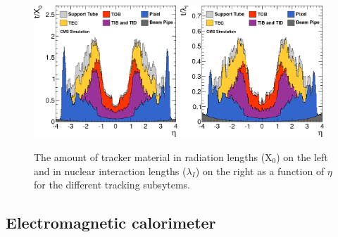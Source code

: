 \begin{figure}
  \includegraphics[width=0.48\textwidth]{ch2_cms_exp/plots/tracker_material.png}
  \includegraphics[width=0.48\textwidth]{ch2_cms_exp/plots/tracker_material_lambda.png}
  \caption[CMS tracker material budget]{The amount of \CMS tracker material in radiation lengths (X$_{0}$) on the left and in nuclear interaction lengths ($\lambda_{I}$) on the right as a function of $\eta$ for the different tracking subsytems.}
  \label{fig:tracker_material}
\end{figure}

\subsection{Electromagnetic calorimeter}
\label{sec:ecal}


